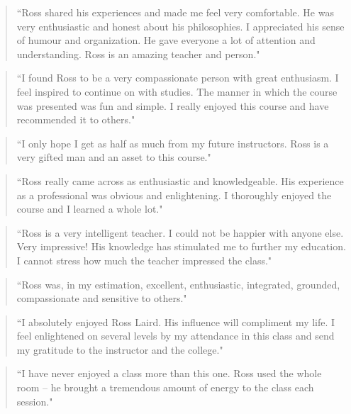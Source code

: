 \documentclass[10pt,DIV09,letterpaper,oneside,headsepline]{scrreprt}
\begin{document}
\begin{quote}
``Ross shared his experiences and made me feel very comfortable. He was very enthusiastic and honest about his philosophies. I appreciated his sense of humour and organization. He gave everyone a lot of attention and understanding. Ross is an amazing teacher and person."
\end{quote}

\begin{quote} ``I found Ross to be a very compassionate person with great enthusiasm. I feel inspired to continue on with studies. The manner in which the course was presented was fun and simple. I really enjoyed this course and have recommended it to others." \end{quote}

\begin{quote} ``I only hope I get as half as much from my future instructors. Ross is a very gifted man and an asset to this course." \end{quote}

\begin{quote} ``Ross really came across as enthusiastic and knowledgeable. His experience as a professional was obvious and enlightening. I thoroughly enjoyed the course and I learned a whole lot." \end{quote}

\begin{quote} ``Ross is a very intelligent teacher. I could not be happier with anyone else. Very impressive! His knowledge has stimulated me to further my education. I cannot stress how much the teacher impressed the class." \end{quote}

\begin{quote} ``Ross was, in my estimation, excellent, enthusiastic, integrated, grounded, compassionate and sensitive to others." \end{quote}

\begin{quote}
``I absolutely enjoyed Ross Laird. His influence will compliment my life. I feel enlightened on several levels by my attendance in this class and send my gratitude to the instructor and the college."
\end{quote}

\begin{quote} ``I have never enjoyed a class more than this one. Ross used the whole room -- he brought a tremendous amount of energy to the class each session." \end{quote}
\end{document}
